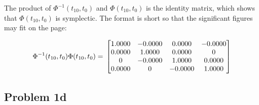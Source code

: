 \documentclass[conf]{new-aiaa}
\begin{document}
The product of $\Phi^{-1}(t_{10}, t_0)$ and $\Phi(t_{10}, t_0)$ is the identity matrix, which shows that $\Phi(t_{10}, t_0)$ is symplectic. The format is short so that the significant figures may fit on the page: 

\begin{equation}
	\Phi^{-1}(t_{10}, t_0) \Phi(t_{10}, t_0) = \\
	\begin{bmatrix}
				
		1.0000 &  -0.0000 &   0.0000 &  -0.0000 \\
		0.0000 &   1.0000 &   0.0000 &        0 \\
		0  & -0.0000 &   1.0000 &   0.0000      \\
		0.0000 &        0 &  -0.0000 &   1.0000
		
	\end{bmatrix}
\end{equation}


\newpage

\subsection*{Problem 1d} 

\begin{center}
	 \\
\end{center}
\end{document}
